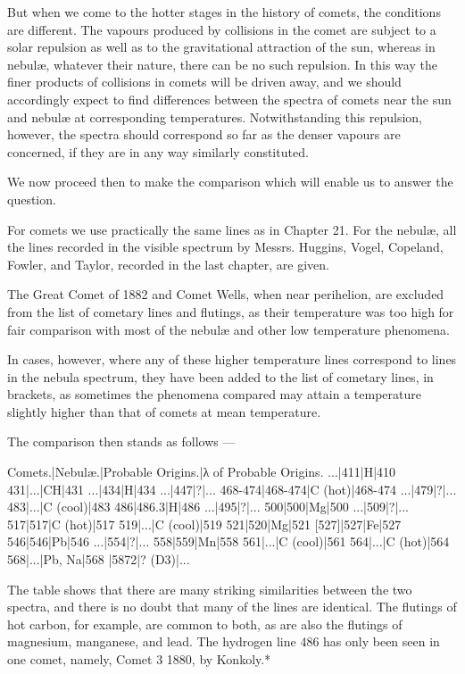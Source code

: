 \documentclass[a4paper, 12pt, oneside, polutonikogreek, english]{article}
\begin{document}
But when we come to the hotter stages in the history of comets, the conditions are different. The vapours produced by collisions in the comet are subject to a solar repulsion as well as to the gravitational attraction of the sun, whereas in nebulæ, whatever their nature, there can be no such repulsion. In this way the finer products of collisions in comets will be driven away, and we should accordingly expect to find differences between the spectra of comets near the sun and nebulæ at corresponding temperatures. Notwithstanding this repulsion, however, the spectra should correspond so far as the denser vapours are concerned, if they are in any way similarly constituted.

We now proceed then to make the comparison which will enable us to answer the question.

For comets we use practically the same lines as in Chapter 21. For the nebulæ, all the lines recorded in the visible spectrum by Messrs. Huggins, Vogel, Copeland, Fowler, and Taylor, recorded in the last chapter, are given.

The Great Comet of 1882 and Comet Wells, when near perihelion, are excluded from the list of cometary lines and flutings, as their temperature was too high for fair comparison with most of the nebulæ and other low temperature phenomena.

In cases, however, where any of these higher temperature lines correspond to lines in the nebula spectrum, they have been added to the list of cometary lines, in brackets, as sometimes the phenomena compared may attain a temperature slightly higher than that of comets at mean temperature.

The comparison then stands as follows ---

Comets.|Nebulæ.|Probable Origins.|λ of Probable Origins. 
...|411|H|410 
431|...|CH|431 
...|434|H|434 
...|447|?|... 
468-474|468-474|C (hot)|468-474 
...|479|?|... 
483|...|C (cool)|483 
486|486.3|H|486 
...|495|?|... 
500|500|Mg|500 
...|509|?|... 
517|517|C (hot)|517 
519|...|C (cool)|519 
521|520|Mg|521 
[527]|527|Fe|527 
546|546|Pb|546 
...|554|?|... 
558|559|Mn|558 
561|...|C (cool)|561 
564|...|C (hot)|564 
568|...|Pb, Na|568 
|5872|? (D3)|... 

The table shows that there are many striking similarities between the two spectra, and there is no doubt that many of the lines are identical. The flutings of hot carbon, for example, are common to both, as are also the flutings of magnesium, manganese, and lead. The hydrogen line 486 has only been seen in one comet, namely, Comet 3 1880, by Konkoly.*
\end{document}
